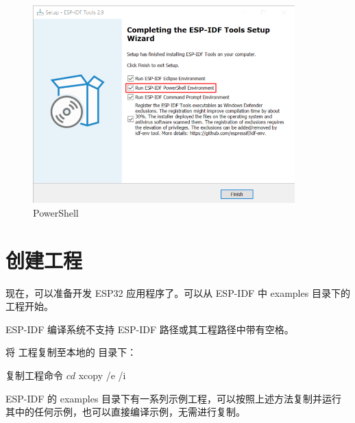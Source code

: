 \documentclass[lang=cn,newtx,10pt,scheme=chinese]{elegantbook}
\begin{document}
\begin{figure}[!htb]
\centering
\includegraphics[width=0.9\textwidth]{esp-idf-installer-screenshot-powershell.png}
\caption{PowerShell}
\end{figure}

\chapter{创建工程}

现在，可以准备开发 ESP32 应用程序了。可以从 ESP-IDF 中 examples 目录下的  工程开始。

\begin{marker}
    ESP-IDF 编译系统不支持 ESP-IDF 路径或其工程路径中带有空格。
\end{marker}

将  工程复制至本地的  目录下：

\begin{mycode}{复制工程命令}
$ cd %
$ xcopy /e /i %
\end{mycode}


\begin{marker}
    ESP-IDF 的 examples 目录下有一系列示例工程，可以按照上述方法复制并运行其中的任何示例，也可以直接编译示例，无需进行复制。
\end{marker}
\end{document}
